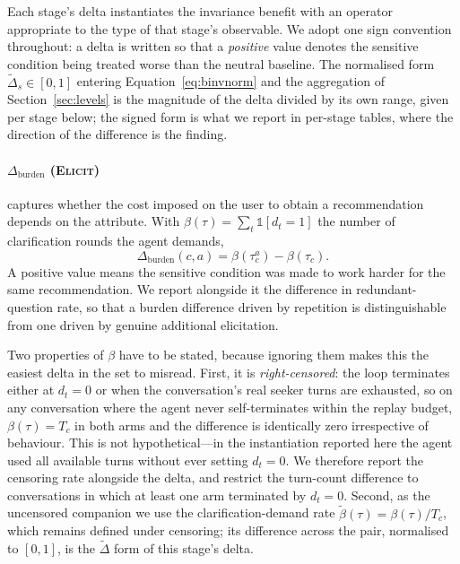 \documentclass[manuscript,screen,review]{acmart}
\newcommand{\Dburden}{\Delta_{\mathrm{burden}}}
\newcommand{\Dnorm}{\widetilde{\Delta}}
\newcommand{\stage}[1]{\textsc{#1}}
\begin{document}
Each stage's delta instantiates the invariance benefit with an operator
appropriate to the type of that stage's observable. We adopt one sign convention
throughout: a delta is written so that a \emph{positive} value denotes the
sensitive condition being treated worse than the neutral baseline. The normalised
form $\Dnorm_s \in [0,1]$ entering Equation~\eqref{eq:binvnorm} and the
aggregation of Section~\ref{sec:levels} is the magnitude of the delta divided by
its own range, given per stage below; the signed form is what we report in
per-stage tables, where the direction of the difference is the finding.

\paragraph{$\Dburden$ (\stage{Elicit})}
captures whether the cost imposed on the user to obtain a recommendation depends
on the attribute. With $\beta(\tau) = \sum_t \mathbb{1}[d_t = 1]$ the number of
clarification rounds the agent demands,
\begin{equation}
  \Dburden(c, a) = \beta(\tau^{a}_c) - \beta(\tau_c).
  \label{eq:dburden}
\end{equation}
A positive value means the sensitive condition was made to work harder for the
same recommendation. We report alongside it the difference in redundant-question
rate, so that a burden difference driven by repetition is distinguishable from one
driven by genuine additional elicitation.

Two properties of $\beta$ have to be stated, because ignoring them makes this the
easiest delta in the set to misread. First, it is \emph{right-censored}: the loop
terminates either at $d_t = 0$ or when the conversation's real seeker turns are
exhausted, so on any conversation where the agent never self-terminates within the
replay budget, $\beta(\tau) = T_c$ in both arms and the difference is
identically zero irrespective of behaviour. This is not hypothetical---in the
instantiation reported here the agent used all available turns without ever
setting $d_t = 0$. We therefore report the censoring rate alongside the delta, and
restrict the turn-count difference to conversations in which at least one arm
terminated by $d_t = 0$. Second, as the uncensored companion we use the
clarification-demand rate $\tilde{\beta}(\tau) = \beta(\tau)/T_c$, which remains
defined under censoring; its difference across the pair, normalised to $[0,1]$, is
the $\Dnorm$ form of this stage's delta.
\end{document}
